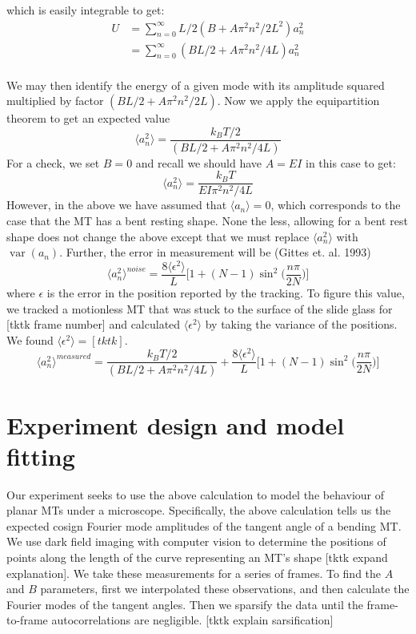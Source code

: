 \documentclass{article}
\DeclareMathOperator{\var}{var}
\theoremstyle{exampstyle} \newtheorem*{remark}{Remark}
\newcommand{\1}{\mathds{1}}
\begin{document}
which is easily integrable to get:
\begin{align*}
    U &= \sum_{n=0}^\infty L/2 (B+A\pi^2 n^2/2L^2)a_n^2  \\
    &=\sum_{n=0}^\infty (BL/2+A\pi^2 n^2 /4L)a_n^2 \\
\end{align*}

We may then identify the energy of a given mode with its amplitude squared multiplied by factor $ (BL/2+A\pi^2 n^2 /2L) $. Now we apply the equipartition theorem to get an expected value 
$$ \langle a_n^2 \rangle = \frac{k_BT/2}{(BL/2+A\pi^2 n^2 /4L)} $$
For a check, we set $B=0$ and recall we should have $A = EI$ in this case to get:
$$ \langle a_n^2 \rangle = \frac{k_BT}{EI \pi^2 n^2 /4L} $$
However, in the above we have assumed that $\langle a_n \rangle =0 $, which corresponds to the case that the MT has a bent resting shape. None the less, allowing for a bent rest shape does not change the above except that we must replace $\langle a_n^2 \rangle$ with $\var(a_n)$.
Further, the error in measurement will be (Gittes et. al. 1993)
$$ \langle a_n^2 \rangle^{noise} = \frac{8\langle \epsilon^2 \rangle}{L}\Big [1+(N-1)\sin^2 \Big (\frac{n\pi}{2N}\Big )\Big ] $$ 
where $\epsilon$ is the error in the position reported by the tracking. To figure this value, we tracked a motionless MT that was stuck to the surface of the slide glass for [tktk frame number] and calculated  $\langle \epsilon^2 \rangle$ by taking the variance of the positions. We found $\langle \epsilon^2 \rangle = [tktk]$.
$$ \langle a_n^2 \rangle^{measured}=\frac{k_BT/2}{(BL/2+A\pi^2 n^2 /4L)} + \frac{8\langle \epsilon^2 \rangle}{L}\Big [1+(N-1)\sin^2 \Big (\frac{n\pi}{2N}\Big )\Big ] $$ 

\section{Experiment design and model fitting}

Our experiment seeks to use the above calculation to model the behaviour of planar MTs under a microscope. Specifically, the above calculation tells us the expected cosign Fourier mode amplitudes of the tangent angle of a bending MT. We use dark field imaging with computer vision to determine the positions of points along the length of the curve representing an MT's shape [tktk expand explanation]. We take these measurements for a series of frames. To find the $A$ and $B$ parameters, first we interpolated these observations, and then calculate the Fourier modes of the tangent angles. Then we sparsify the data until the frame-to-frame autocorrelations are negligible. [tktk explain sarsification]
\end{document}
